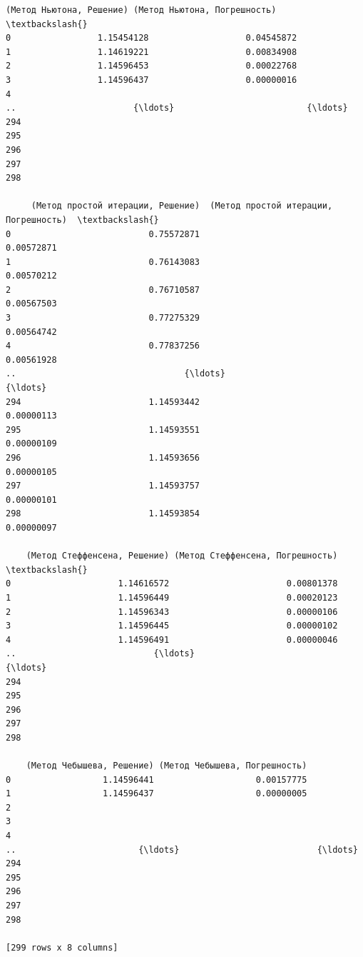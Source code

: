 \documentclass[11pt]{article}
\makeatletter
\newcommand{\boxspacing}{\kern\kvtcb@left@rule\kern\kvtcb@boxsep}
\newcommand{\prompt}[4]{
        {\ttfamily\llap{{\color{#2}[#3]:\hspace{3pt}#4}}\vspace{-\baselineskip}}
    }
\makeatother
\begin{document}
            \begin{tcolorbox}[breakable, size=fbox, boxrule=.5pt, pad at break*=1mm, opacityfill=0]
\prompt{Out}{outcolor}{29}{\boxspacing}
\begin{Verbatim}[commandchars=\\\{\}]
    (Метод Ньютона, Решение) (Метод Ньютона, Погрешность)  \textbackslash{}
0                 1.15454128                   0.04545872
1                 1.14619221                   0.00834908
2                 1.14596453                   0.00022768
3                 1.14596437                   0.00000016
4
..                       {\ldots}                          {\ldots}
294
295
296
297
298

     (Метод простой итерации, Решение)  (Метод простой итерации, Погрешность)  \textbackslash{}
0                           0.75572871                             0.00572871
1                           0.76143083                             0.00570212
2                           0.76710587                             0.00567503
3                           0.77275329                             0.00564742
4                           0.77837256                             0.00561928
..                                 {\ldots}                                    {\ldots}
294                         1.14593442                             0.00000113
295                         1.14593551                             0.00000109
296                         1.14593656                             0.00000105
297                         1.14593757                             0.00000101
298                         1.14593854                             0.00000097

    (Метод Стеффенсена, Решение) (Метод Стеффенсена, Погрешность)  \textbackslash{}
0                     1.14616572                       0.00801378
1                     1.14596449                       0.00020123
2                     1.14596343                       0.00000106
3                     1.14596445                       0.00000102
4                     1.14596491                       0.00000046
..                           {\ldots}                              {\ldots}
294
295
296
297
298

    (Метод Чебышева, Решение) (Метод Чебышева, Погрешность)
0                  1.14596441                    0.00157775
1                  1.14596437                    0.00000005
2
3
4
..                        {\ldots}                           {\ldots}
294
295
296
297
298

[299 rows x 8 columns]
\end{Verbatim}
\end{tcolorbox}
        
\end{document}

